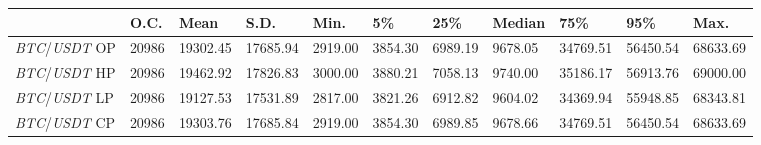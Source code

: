 \begin{tabular}{lllllllllll}
\toprule
 & \textbf{O.C.} & \textbf{Mean} & \textbf{S.D.} & \textbf{Min.} & \textbf{5\%} & \textbf{25\%} & \textbf{Median} & \textbf{75\%} & \textbf{95\%} & \textbf{Max.} \\
\midrule
\emph{BTC}/\emph{USDT} OP & 20986 & 19302.45 & 17685.94 & 2919.00 & 3854.30 & 6989.19 & 9678.05 & 34769.51 & 56450.54 & 68633.69 \\
\emph{BTC}/\emph{USDT} HP & 20986 & 19462.92 & 17826.83 & 3000.00 & 3880.21 & 7058.13 & 9740.00 & 35186.17 & 56913.76 & 69000.00 \\
\emph{BTC}/\emph{USDT} LP & 20986 & 19127.53 & 17531.89 & 2817.00 & 3821.26 & 6912.82 & 9604.02 & 34369.94 & 55948.85 & 68343.81 \\
\emph{BTC}/\emph{USDT} CP & 20986 & 19303.76 & 17685.84 & 2919.00 & 3854.30 & 6989.85 & 9678.66 & 34769.51 & 56450.54 & 68633.69 \\
\bottomrule
\end{tabular}
